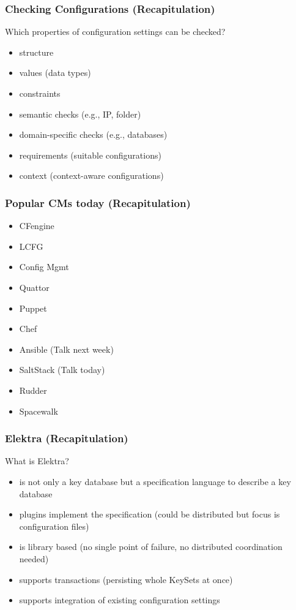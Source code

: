 \begin{frame}
	\frametitle{Checking Configurations (Recapitulation)}

	\begin{task}
	Which properties of configuration settings can be checked?
	\end{task}

	\pause

	\begin{itemize} %
	\item structure
	\item values (data types)
	\item constraints
	\item semantic checks (e.g., IP, folder)
	\item domain-specific checks (e.g., databases)
	\item requirements (suitable configurations)
	\item context (context-aware configurations)
	\end{itemize}
\end{frame}

\begin{frame}
	\frametitle{Popular CMs today (Recapitulation)}

	\begin{itemize} %
	\item CFengine
	\item LCFG
	\item Config Mgmt
	\item Quattor
	\item Puppet
	\item Chef
	\item Ansible (Talk next week)
	\item SaltStack (Talk today)
	\item Rudder
	\item Spacewalk
	\end{itemize}
\end{frame}

\begin{frame}
	\frametitle{Elektra (Recapitulation)}

	\begin{task}
	What is Elektra?
	\end{task}

	\pause

	\begin{itemize}
	\item is not only a key database but a specification language to describe a key database
	\item plugins implement the specification (could be distributed but focus is configuration files)
	\item is library based (no single point of failure, no distributed coordination needed)
	\item supports transactions (persisting whole KeySets at once)
	\item supports integration of existing configuration settings
	\end{itemize}
\end{frame}



